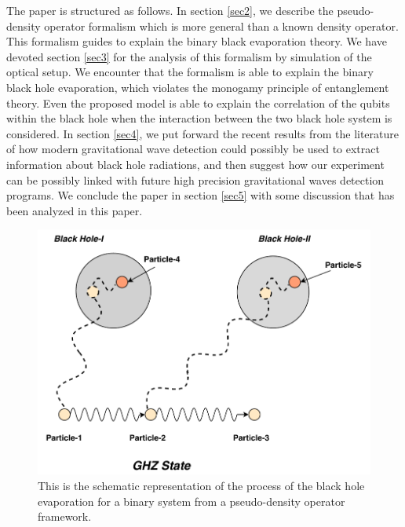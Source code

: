 \documentclass[fleqn,usenatbib]{mnras}
\begin{document}
The paper is structured as follows.  In section \ref{sec2}, we describe the pseudo-density operator formalism which is more general than a known density operator. This formalism guides to explain the binary black evaporation theory. We have devoted section \ref{sec3} for the analysis of this formalism by simulation of the optical setup. We encounter that the formalism is able to explain the binary black hole evaporation, which violates the monogamy principle of entanglement theory. Even the proposed model is able to explain the correlation of the qubits within the black hole when the interaction between the two black hole system is considered. In section \ref{sec4}, we put forward the recent results from the literature of how modern gravitational wave detection could possibly be used to extract information about black hole radiations, and then suggest how our experiment can be possibly linked with future high precision gravitational waves detection programs. We conclude the paper in section \ref{sec5} with some discussion that has been analyzed in this paper. 






\begin{figure}
	\includegraphics[width=\columnwidth]{plots/Blackhole_1.pdf}
    \caption{This is the schematic representation of the process of the black hole evaporation for a binary system from a pseudo-density operator framework.}
    \label{f2}
\end{figure}
\end{document}

